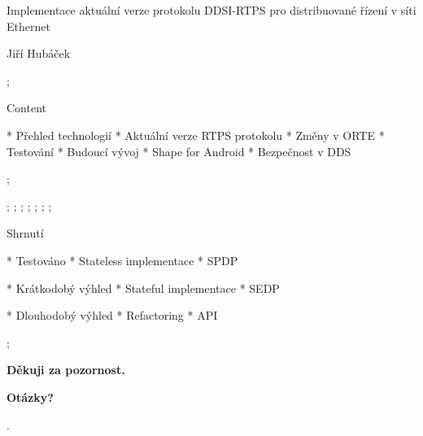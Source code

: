 

\worktype[M/CZ]

\slideshow

\tit Implementace aktuální verze protokolu DDSI-RTPS pro distribuované řízení v síti Ethernet

\subtit Jiří Hubáček

\pg;


\sec Content

* Přehled technologií
* Aktuální verze RTPS protokolu
* Změny v ORTE
* Testování
* Budoucí vývoj
* Shape for Android
* Bezpečnost v DDS

\pg;

 \pg;
 \pg;
 \pg;
 \pg;
 \pg;
 \pg;
 \pg;


\sec Shrnutí

* Testováno
\begitems
* Stateless implementace
* SPDP
\enditems

* Krátkodobý výhled
\begitems
* Stateful implementace
* SEDP
\enditems

* Dlouhodobý výhled
\begitems
* Refactoring
* API
\enditems

\pg;

\null
\vskip2cm
\centerline{\typosize[35/40]\bf Děkuji za pozornost.}

\vskip2cm
\centerline{\Blue\typosize[60/70]\bf Otázky?}

\pg.
